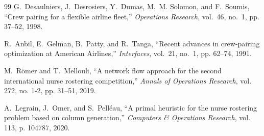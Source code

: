 \documentclass[10pt,journal,compsoc]{IEEEtran}
\begin{document}
\begin{thebibliography}{99}
G.~Desaulniers, J.~Desrosiers, Y.~Dumas, M.~M. Solomon, and F.~Soumis, ``Crew pairing for a flexible airline fleet,'' \emph{Operations Research}, vol.~46, no.~1, pp. 37--52, 1998.

R.~Anbil, E.~Gelman, B.~Patty, and R.~Tanga, ``Recent advances in crew-pairing optimization at American Airlines,'' \emph{Interfaces}, vol.~21, no.~1, pp. 62--74, 1991.

M.~R{\"o}mer and T.~Mellouli, ``A network flow approach for the second international nurse rostering competition,'' \emph{Annals of Operations Research}, vol. 272, no. 1-2, pp. 31--51, 2019.

A.~Legrain, J.~Omer, and S.~Pell{\'e}au, ``A primal heuristic for the nurse rostering problem based on column generation,'' \emph{Computers \& Operations Research}, vol. 113, p. 104787, 2020.

\end{thebibliography}
\end{document}
